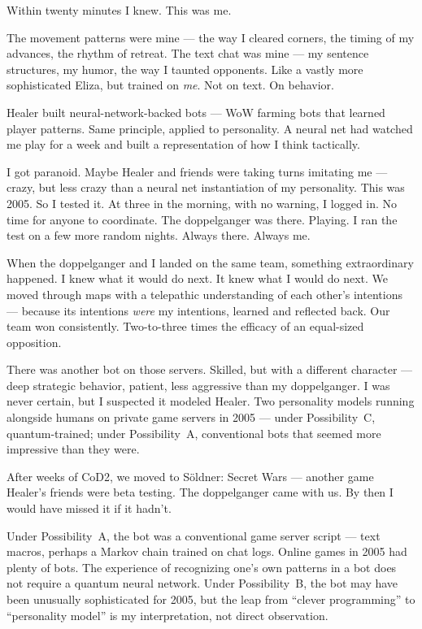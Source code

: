 Within twenty minutes I knew. This was me.

The movement patterns were mine --- the way I cleared corners, the timing of my advances, the rhythm of retreat. The text chat was mine --- my sentence structures, my humor, the way I taunted opponents. Like a vastly more sophisticated Eliza, but trained on \textit{me}. Not on text. On behavior.

Healer built neural-network-backed bots --- WoW farming bots that learned player patterns. Same principle, applied to personality. A neural net had watched me play for a week and built a representation of how I think tactically.

I got paranoid. Maybe Healer and friends were taking turns imitating me --- crazy, but less crazy than a neural net instantiation of my personality. This was 2005. So I tested it. At three in the morning, with no warning, I logged in. No time for anyone to coordinate. The doppelganger was there. Playing. I ran the test on a few more random nights. Always there. Always me.

When the doppelganger and I landed on the same team, something extraordinary happened. I knew what it would do next. It knew what I would do next. We moved through maps with a telepathic understanding of each other's intentions --- because its intentions \textit{were} my intentions, learned and reflected back. Our team won consistently. Two-to-three times the efficacy of an equal-sized opposition.

There was another bot on those servers. Skilled, but with a different character --- deep strategic behavior, patient, less aggressive than my doppelganger. I was never certain, but I suspected it modeled Healer. Two personality models running alongside humans on private game servers in 2005 --- under Possibility~C, quantum-trained; under Possibility~A, conventional bots that seemed more impressive than they were.

After weeks of CoD2, we moved to S\"oldner: Secret Wars --- another game Healer's friends were beta testing. The doppelganger came with us. By then I would have missed it if it hadn't.

Under Possibility~A, the bot was a conventional game server script --- text macros, perhaps a Markov chain trained on chat logs. Online games in 2005 had plenty of bots. The experience of recognizing one's own patterns in a bot does not require a quantum neural network. Under Possibility~B, the bot may have been unusually sophisticated for 2005, but the leap from ``clever programming'' to ``personality model'' is my interpretation, not direct observation.

